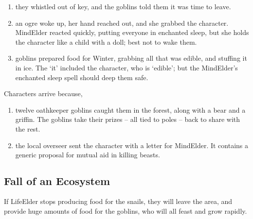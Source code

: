 \begin{enumerate}
  \item
  they whistled out of key, and the goblins told them it was time to leave.
  \item
  an ogre woke up, her hand reached out, and she grabbed the character.
  \gls{MindElder} reacted quickly, putting everyone in enchanted sleep, but she holds the character like a child with a doll; best not to wake them.
  \item
  goblins prepared food for Winter, grabbing all that was edible, and stuffing it in ice.
  The `it' included the character, who is `edible'; but the \gls{MindElder}'s enchanted sleep spell should deep them safe.
\end{enumerate}

Characters arrive because,

\begin{enumerate}
  \item
  twelve oathkeeper goblins caught them in the forest, along with a bear and a griffin.
  The goblins take their prizes -- all tied to poles -- back to share with the rest.
  \item
  the local overseer sent the character with a letter for \gls{MindElder}.
  It contains a generic proposal for mutual aid in killing beasts.
\end{enumerate}

\subsection{Fall of an Ecosystem}

If \gls{LifeElder} stops producing food for the snails, they will leave the area, and provide huge amounts of food for the goblins, who will all feast and grow rapidly.


